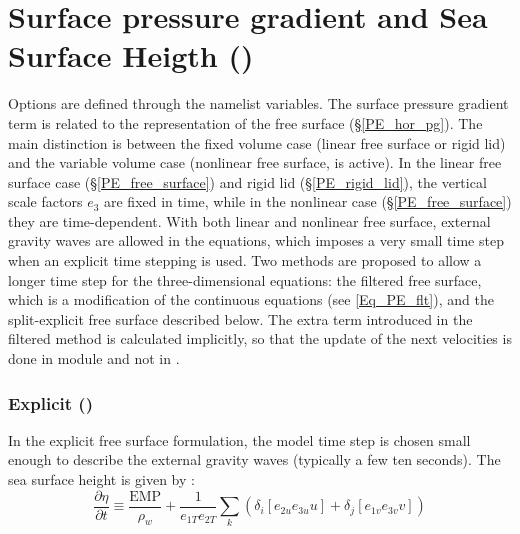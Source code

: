 \documentclass[NEMO_book]{subfiles}
\begin{document}
\section{Surface pressure gradient and Sea Surface Heigth ()}
\label{DYN_hpg_spg}
Options are defined through the   namelist variables.
The surface pressure gradient term is related to the representation of the free surface (\S\ref{PE_hor_pg}). The main distinction is between the fixed volume case (linear free surface or rigid lid) and the variable volume case (nonlinear free surface,  is active). In the linear free surface case (\S\ref{PE_free_surface}) and rigid lid (\S\ref{PE_rigid_lid}), the vertical scale factors $e_{3}$ are fixed in time, while in the nonlinear case (\S\ref{PE_free_surface}) they are time-dependent. With both linear and nonlinear free surface, external gravity waves are allowed in the equations, which imposes a very small time step when an explicit time stepping is used. Two methods are proposed to allow a longer time step for the three-dimensional equations: the filtered free surface, which is a modification of the continuous equations (see \eqref{Eq_PE_flt}), and the split-explicit free surface described below. The extra term introduced in the filtered method is calculated implicitly, so that the update of the next velocities is done in module  and not in .

\subsubsection{Explicit ()}
\label{DYN_spg_exp}

In the explicit free surface formulation, the model time step is chosen small enough to describe the external gravity waves (typically a few ten seconds). The sea surface height is given by :
\begin{equation} \label{Eq_dynspg_ssh}
\frac{\partial \eta }{\partial t}\equiv \frac{\text{EMP}}{\rho _w }+\frac{1}{e_{1T} 
e_{2T} }\sum\limits_k {\left( {\delta _i \left[ {e_{2u} e_{3u} u} 
\right]+\delta _j \left[ {e_{1v} e_{3v} v} \right]} \right)} 
\end{equation}
\end{document}
